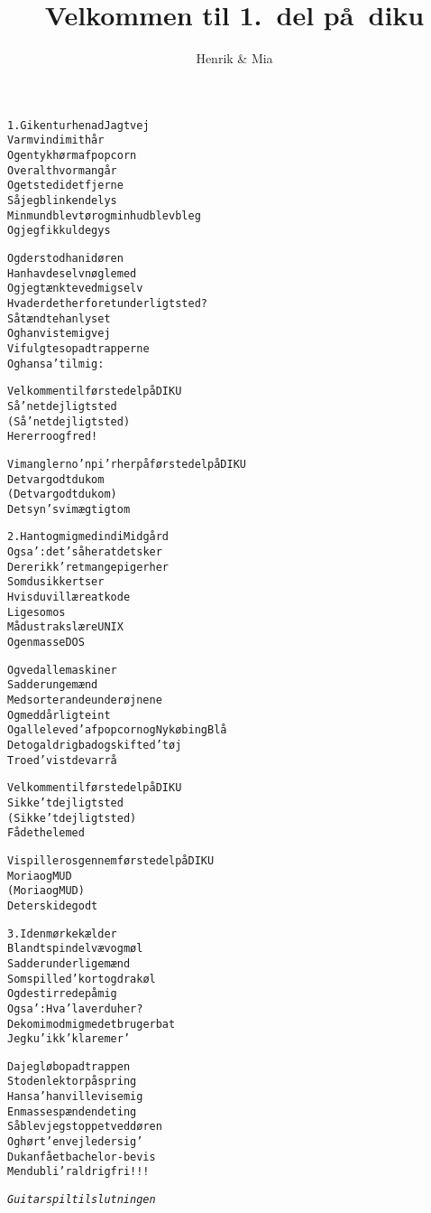 \documentclass[a4paper,11pt]{article}
\title{Velkommen til 1.\ del p\aa\ {\sc diku}}
\author{Henrik \& Mia}
\begin{document}
\maketitle

\begin{alltt}

  \rm
  1.  Gik en tur hen ad Jagtvej 
  Varm vind i mit h\aa{}r 
  Og en tyk h\o{}rm af popcorn
  Overalt hvor man g\aa{}r
  Og et sted i det fjerne 
  S\aa{} jeg blinkende lys
  Min mund blev t\o{}r og min hud blev bleg
  Og jeg fik kuldegys

  Og der stod han i d\o{}ren 
  Han havde selv n\o{}gle med
  Og jeg t\ae{}nkte ved mig selv 
  Hvad er det her for et underligt sted ?
  S\aa{} t\ae{}ndte han lyset 
  Og han viste mig vej
  Vi fulgtes op ad trapperne 
  Og han sa' til mig:

  Velkommen til f\o{}rste del p\aa{} DIKU
  S\aa{}'n et dejligt sted
  (S\aa{}'n et dejligt sted)
  Her er ro og fred!

  Vi mangler no'n pi'r her p\aa{} f\o{}rste del p\aa{} DIKU
  Det var godt du kom
  (Det var godt du kom)
  Det syn's vi m\ae{}gtigt om


  2.  Han tog mig med ind i Midg\aa{}rd
  Og sa': det' s\aa{} her at det sker
  Der er ikk' ret mange piger her
  Som du sikkert ser
  Hvis du vil l\ae{}re at kode
  Ligesom os
  M\aa{} du straks l\ae{}re UNIX
  Og en masse DOS 

  Og ved alle maskiner 
  Sad der unge m\ae{}nd
  Med sorte rande under \o{}jnene
  Og med d\aa{}rlig teint
  Og alle leved' af popcorn og Nyk\o{}bing Bl\aa{}
  De tog aldrig bad og skifted' t\o{}j
  Troed' vist de var r\aa{}

  Velkommen til f\o{}rste del p\aa{} DIKU
  Sikke't dejligt sted
  (Sikke't dejligt sted)
  F\aa{} det hele med

  Vi spiller os gennem f\o{}rste del p\aa{} DIKU
  Moria og MUD
  (Moria og MUD)
  Det er skidegodt


  3.  I den m\o{}rke k\ae{}lder 
  Blandt spindelv\ae{}v og m\o{}l
  Sad der underlige m\ae{}nd 
  Som spilled' kort og drak \o{}l
  Og de stirrede p\aa{} mig
  Og sa': Hva' laver du her?
  De kom imod mig med et brugerbat 
  Jeg ku' ikk' klare mer'

  Da jeg l\o{}b op ad trappen
  Stod en lektor p\aa{} spring
  Han sa' han ville vise mig
  En masse sp\ae{}ndende ting
  S\aa{} blev jeg stoppet ved d\o{}ren 
  Og h\o{}rt' en vejleder sig'
  Du kan f\aa{} et bachelor-bevis
  Men du bli'r aldrig fri!!!


  { \em Guitarspil til slutningen }
  
\end{alltt}
\end{document}

